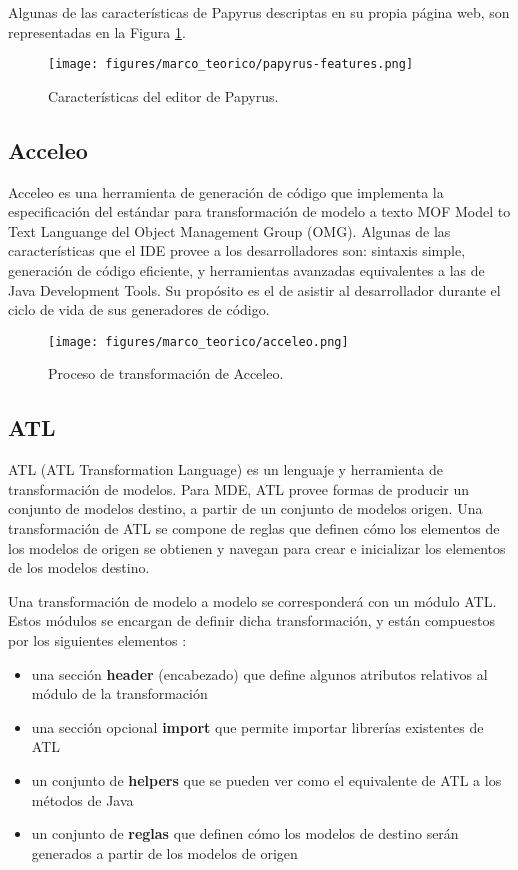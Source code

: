 Algunas de las características de Papyrus descriptas en su propia página web, son representadas en la Figura \ref{fig:marco:papyrus_editor}.

\begin{figure}[htbp]
    \centering
    \texttt{[image: figures/marco\_teorico/papyrus-features.png]}
    \caption{Características del editor de Papyrus. \cite{papyrus}}
    \label{fig:marco:papyrus_editor}
\end{figure}

\subsection{Acceleo}
Acceleo es una herramienta de generación de código que implementa la especificación del estándar para transformación de modelo a texto MOF Model to Text Languange del Object Management Group (OMG). Algunas de las características que el IDE provee a los desarrolladores son: sintaxis simple, generación de código eficiente, y herramientas avanzadas equivalentes a las de Java Development Tools. Su propósito es el de asistir al desarrollador durante el ciclo de vida de sus generadores de código. \cite{acceleo}

\begin{figure}[htbp]
    \centering
    \texttt{[image: figures/marco\_teorico/acceleo.png]}
    \caption{Proceso de transformación de Acceleo.}
    \label{fig:marco:acceleo_transformation}
\end{figure}

\subsection{ATL}
ATL (ATL Transformation Language) es un lenguaje y herramienta de transformación de modelos. Para MDE, ATL provee formas de producir un conjunto de modelos destino, a partir de un conjunto de modelos origen. Una transformación de ATL se compone de reglas que definen cómo los elementos de los modelos de origen se obtienen y navegan para crear e inicializar los elementos de los modelos destino. \cite{atl}

Una transformación de modelo a modelo se corresponderá con un módulo ATL. Estos módulos se encargan de definir dicha transformación, y están compuestos por los siguientes elementos \cite{atloverview}:

\begin{itemize}
    \item una sección \textbf{header} (encabezado) que define algunos atributos relativos al módulo de la transformación
    \item una sección opcional \textbf{import} que permite importar librerías existentes de ATL
    \item un conjunto de \textbf{helpers} que se pueden ver como el equivalente de ATL a los métodos de Java
    \item un conjunto de \textbf{reglas} que definen cómo los modelos de destino serán generados a partir de los modelos de origen
\end{itemize}

